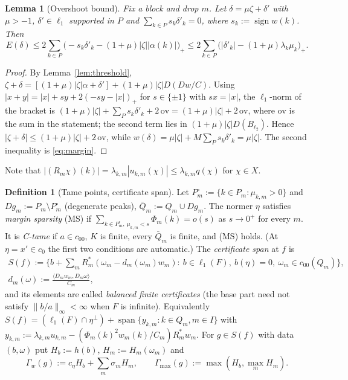 \documentclass[10pt]{amsart}
\newtheorem{lemma}[theorem]{Lemma}
\theoremstyle{definition}
\newtheorem{definition}[theorem]{Definition}
\theoremstyle{remark}
\newcommand{\sgn}{\operatorname{sign}}
\newcommand{\spn}{\operatorname{span}}
\newcommand{\ip}[2]{\langle #1,#2\rangle}
\begin{document}
\begin{lemma}[Overshoot bound]\label{lem:overshoot}
Fix a block and drop $m$.  Let $\delta=\mu\zeta+\delta'$ with $\mu>-1$,
$\delta'\in\ell_1$ supported in $P$ and $\sum_{k\in P}s_k\delta'_k=0$, where
$s_k:=\sgn w(k)$.  Then
\[
 E(\delta)\le2\sum_{k\in P}\big(-s_k\delta'_k-(1+\mu)|\zeta||\alpha(k)|
 \big)_+\le2\sum_{k\in P}\big(|\delta'_k|-(1+\mu)\lambda_k\mu_k\big)_+ .
\]
\end{lemma}

\begin{proof}
By Lemma~\ref{lem:threshold}, $\zeta+\delta=[(1+\mu)|\zeta|\alpha+\delta']
+(1+\mu)|\zeta|D(Dw/C)$.  Using $|x+y|=|x|+sy+2(-sy-|x|)_+$ for $s\in\{\pm1\}$
with $sx=|x|$, the $\ell_1$-norm of the bracket is $(1+\mu)|\zeta|+
\sum_Ps_k\delta'_k+2\,\mathrm{ov}=(1+\mu)|\zeta|+2\,\mathrm{ov}$, where
$\mathrm{ov}$ is the sum in the statement; the second term lies in
$(1+\mu)|\zeta|D(B_{\ell_2})$.  Hence $|\zeta+\delta|\le(1+\mu)|\zeta|
+2\,\mathrm{ov}$, while $w(\delta)=\mu|\zeta|+M\sum_Ps_k\delta'_k=\mu|\zeta|$.
The second inequality is \eqref{eq:margin}.
\end{proof}

Note that $|(R_m\chi)(k)|=\lambda_{k,m}|u_{k,m}(\chi)|\le\lambda_{k,m}q(\chi)$
for $\chi\in X$.

\begin{definition}[Tame points, certificate span]\label{def:tame}
Let $P^\circ_m:=\{k\in P_m:\mu_{k,m}>0\}$ and $Dg_m:=P_m\setminus P_m^\circ$
(degenerate peaks), $\bar Q_m:=Q_m\cup Dg_m$.  The normer $\eta$ satisfies
\emph{margin sparsity} \textup{(MS)} if
$\sum_{k\in P_m^\circ,\ \mu_{k,m}<s}\Phi_m(k)=o(s)$ as $s\to0^+$ for every
$m$.  It is \emph{C-tame} if $a\in c_{00}$, $K$ is finite, every
$\bar Q_m$ is finite, and \textup{(MS)} holds.  (At $\eta=x'\in c_0$ the
first two conditions are automatic.)  The \emph{certificate span} at $f$ is
\begin{gather*}
 S(f):=\Big\{b+\sum_mR_m^*(\omega_m-d_m(\omega_m)w_m):\ b\in\ell_1(F),\
 b(\eta)=0,\ \omega_m\in c_{00}(Q_m)\Big\},\\
 d_m(\omega):=\frac{\ip{D_mw_m}{D_m\omega}}{C_m},
\end{gather*}
and its elements are called \emph{balanced finite certificates} (the base
part need not satisfy $\|b/a\|_\infty<\infty$ when $F$ is infinite).
Equivalently
$S(f)=(\ell_1(F)\cap\eta^\perp)+\spn\{y_{k,m}:k\in Q_m,m\in I\}$ with
$y_{k,m}:=\lambda_{k,m}u_{k,m}-(\Phi_m(k)^2w_m(k)/C_m)R_m^*w_m$.  For
$g\in S(f)$ with data $(b,\omega)$ put $H_b:=h(b)$, $H_m:=H_m(\omega_m)$ and
\[
 \Gamma_w(g):=c_\eta H_b+\sum_m\sigma_mH_m,\qquad
 \Gamma_{\max}(g):=\max(H_b,\max_mH_m).
\]
\end{definition}
\end{document}
